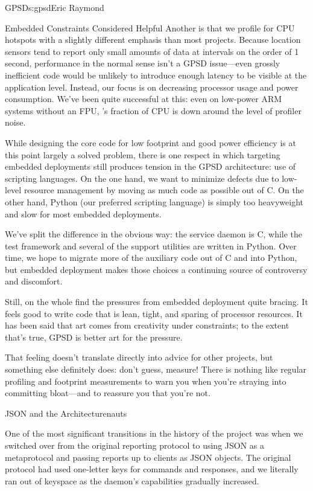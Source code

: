 \begin{aosachapter}{GPSD}{s:gpsd}{Eric Raymond}
\begin{aosasect1}{Embedded Constraints Considered Helpful}
Another is that we profile for CPU hotspots with a slightly different
emphasis than most projects. Because location sensors tend to report
only small amounts of data at intervals on the order of 1 second,
performance in the normal sense isn't a GPSD issue---even grossly
inefficient code would be unlikely to introduce enough latency to be
visible at the application level.  Instead, our focus is on decreasing
processor usage and power consumption.  We've been quite successful at
this: even on low-power ARM systems without an FPU, 's
fraction of CPU is down around the level of profiler noise.

While designing the core code for low footprint and good power
efficiency is at this point largely a solved problem, there is one
respect in which targeting embedded deployments still produces tension
in the GPSD architecture: use of scripting languages. On the one hand,
we want to minimize defects due to low-level resource management by
moving as much code as possible out of C.  On the other hand, Python
(our preferred scripting language) is simply too heavyweight and slow
for most embedded deployments.

We've split the difference in the obvious way: the  service
daemon is C, while the test framework and several of the support
utilities are written in Python. Over time, we hope to migrate more of
the auxiliary code out of C and into Python, but embedded deployment
makes those choices a continuing source of controversy and discomfort.

Still, on the whole find the pressures from embedded deployment quite
bracing.  It feels good to write code that is lean, tight, and sparing
of processor resources.  It has been said that art comes from
creativity under constraints; to the extent that's true, GPSD is
better art for the pressure.

That feeling doesn't translate directly into advice for other
projects, but something else definitely does: don't guess, measure!
There is nothing like regular profiling and footprint measurements to
warn you when you're straying into committing bloat---and to reassure
you that you're not.

\end{aosasect1}

\begin{aosasect1}{JSON and the Architecturenauts}

One of the most significant transitions in the history of the project
was when we switched over from the original reporting protocol to
using JSON as a metaprotocol and passing reports up to clients as JSON
objects. The original protocol had used one-letter keys for commands
and responses, and we literally ran out of keyspace as the daemon's
capabilities gradually increased.


\end{aosasect1}
\end{aosachapter}
